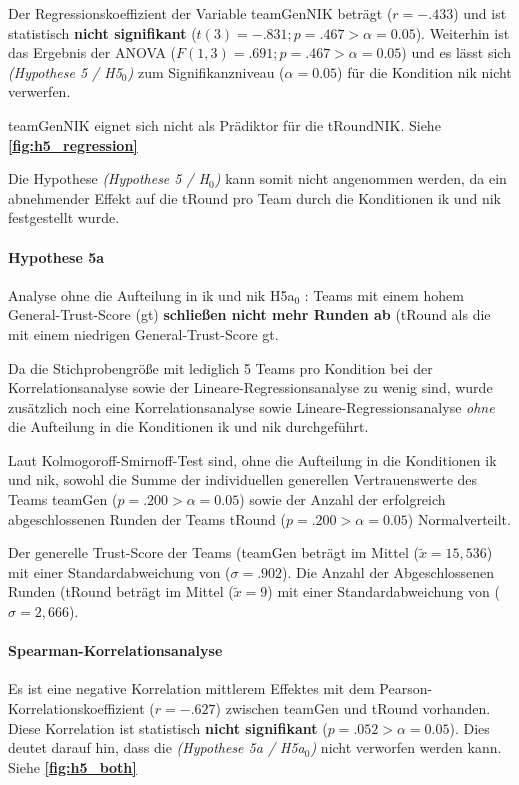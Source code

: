 \documentclass[a4paper,11pt]{article}%
\renewcommand{\\}{\vspace*{0.5\baselineskip} \newline}
\begin{document}
Der Regressionskoeffizient der Variable \ac{teamGenNIK} beträgt ($r = -.433$) und ist statistisch \textbf{nicht signifikant} ($t(3) = -.831; p = .467 > \alpha = 0.05$). \\
Weiterhin ist das Ergebnis der ANOVA ($F(1,3) = .691; p = .467 > \alpha = 0.05$) und es lässt sich \textit{(Hypothese 5 / H5$_{0}$)} zum Signifikanzniveau ($\alpha = 0.05$) für die Kondition \ac{nik} nicht verwerfen.

\ac{teamGenNIK} eignet sich nicht als Prädiktor für die \ac{tRoundNIK}. Siehe \textbf{\autoref{fig:h5_regression}}

Die Hypothese \textit{(Hypothese 5 / H$_{0}$)} kann somit nicht angenommen werden, da ein abnehmender Effekt auf die \ac{tRound} pro Team durch die Konditionen \ac{ik} und \ac{nik} festgestellt wurde.

\paragraph{Hypothese 5a} Analyse ohne die Aufteilung in \ac{ik} und \ac{nik}
H5a$_{0}$ : Teams mit einem hohem General-Trust-Score (\ac{gt}) \textbf{schließen nicht mehr Runden ab} (\ac{tRound} als die mit einem niedrigen General-Trust-Score \ac{gt}.

Da die Stichprobengröße mit lediglich 5 Teams pro Kondition bei der Korrelationsanalyse sowie der Lineare-Regressionsanalyse zu wenig sind, wurde zusätzlich noch eine Korrelationsanalyse sowie Lineare-Regressionsanalyse \textit{ohne} die Aufteilung in die Konditionen \ac{ik} und \ac{nik} durchgeführt.

Laut Kolmogoroff-Smirnoff-Test sind, ohne die Aufteilung in die Konditionen \ac{ik} und \ac{nik}, sowohl die Summe der individuellen generellen Vertrauenswerte des Teams \ac{teamGen} ($p = .200 > \alpha = 0.05$) sowie der Anzahl der erfolgreich abgeschlossenen Runden der Teams \ac{tRound} ($p = .200 > \alpha = 0.05$) Normalverteilt.

Der generelle Trust-Score der Teams (\ac{teamGen} beträgt im Mittel ($\tilde x = 15,536$) mit einer Standardabweichung von ($\sigma = .902$).
Die Anzahl der Abgeschlossenen Runden (\ac{tRound} beträgt im Mittel ($\tilde x = 9$) mit einer Standardabweichung von ($\sigma = 2,666$). 

			\paragraph{Spearman-Korrelationsanalyse}
Es ist eine negative Korrelation mittlerem Effektes mit dem Pearson-Korrelationskoeffizient ($r = -.627$) zwischen \ac{teamGen} und \ac{tRound} vorhanden. Diese Korrelation ist statistisch \textbf{nicht signifikant} ($p = .052 > \alpha = 0.05$). Dies deutet darauf hin, dass die \textit{(Hypothese 5a / H5a$_{0}$)} nicht verworfen werden kann. Siehe \textbf{\autoref{fig:h5_both}}
			
\end{document}
